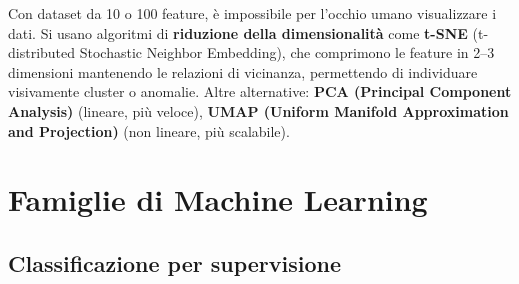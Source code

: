 \begin{notebox}
Con dataset da 10 o 100 feature, è impossibile per l'occhio umano visualizzare i dati. Si usano algoritmi di \textbf{riduzione della dimensionalità} come \textbf{t-SNE} (t-distributed Stochastic Neighbor Embedding), che comprimono le feature in 2--3 dimensioni mantenendo le relazioni di vicinanza, permettendo di individuare visivamente cluster o anomalie. Altre alternative: \textbf{PCA (Principal Component Analysis)} (lineare, più veloce), \textbf{UMAP (Uniform Manifold Approximation and Projection)} (non lineare, più scalabile).
\end{notebox}

\section{Famiglie di Machine Learning}

\subsection{Classificazione per supervisione}

